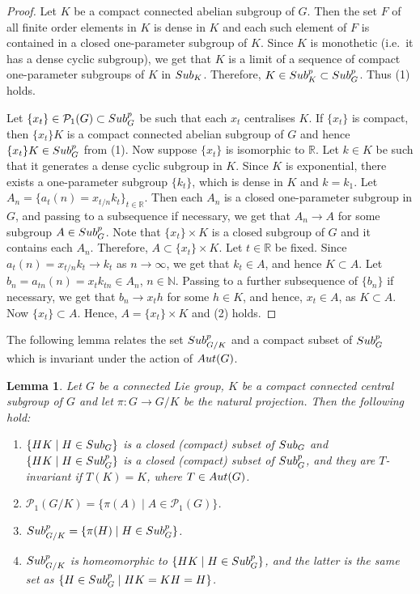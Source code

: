 \documentclass{amsart}
\numberwithin{equation}{section}
\newcommand{\Aut}{{\rm Aut}}
\newcommand{\Sub}{{\rm Sub}}
\newcommand{\N}{{\mathbb N}}
\newcommand{\R}{{\mathbb R}}
\newcommand{\spg}{{\rm Sub}^p_G}
\newcommand{\spp}{{\rm Sub}^{p}}
\newtheorem{lem}[thm]{Lemma}
\theoremstyle{remark}
\newcommand{\cP}{{\mathcal{P}}}
\begin{document}
\begin{proof}
Let $K$ be a compact connected abelian subgroup of $G$. Then the set $F$ of all finite order elements in $K$ is 
dense in $K$ and each such element of $F$ is contained in a closed one-parameter subgroup of $K$. 
Since $K$ is monothetic (i.e.\ it has a dense cyclic subgroup), we get that $K$ is a limit of a sequence of 
compact one-parameter subgroups of $K$ in $\Sub_K$. Therefore, $K\in\spp_K\subset\spg$. Thus (1) holds. 

Let $\{x_t\}\in\cP_1(G)\subset \spg$ be such that each $x_t$ centralises $K$. If $\{x_t\}$ is compact, then 
$\{x_t\}K$ is a compact connected abelian subgroup of $G$ and hence $\{x_t\}K\in\spg$ from (1). 
Now suppose $\{x_t\}$ is isomorphic to $\R$. Let $k\in K$ be such that it generates a 
dense cyclic subgroup in $K$. Since $K$ is exponential, there exists a one-parameter subgroup 
$\{k_t\}$, which is dense in $K$ and $k=k_1$. Let 
$A_n=\{a_t(n)=x_{t/n}k_t\}_{t\in\R}$. Then each $A_n$ is a closed one-parameter subgroup 
in $G$, and passing to a subsequence if necessary, we get that $A_n\to A$ for some subgroup $A\in\spg$. 
Note that $\{x_t\}\times K$ is a closed subgroup of $G$ and it contains each $A_n$. Therefore,  
$A\subset \{x_t\}\times K$. Let $t\in\R$ be fixed. Since $a_t(n)=x_{t/n}k_t\to k_t$ as $n\to\infty$, we get 
that $k_t\in A$, and hence $K\subset A$. Let $b_n=a_{tn}(n)=x_tk_{tn}\in A_n$, $n\in\N$. 
Passing to a further subsequence of $\{b_n\}$ if necessary, 
we get that $b_n\to x_th$ for some $h\in K$, and hence, $x_t\in A$, as $K\subset A$. 
Now $\{x_t\}\subset A$. Hence, $A=\{x_t\}\times K$ and (2) holds. 
\end{proof}

The following lemma relates the set $\spp_{G/K}$ and a compact subset of $\spg$ which is invariant 
under the action of $\Aut(G)$.

\begin{lem} \label{subpgk} Let $G$ be a connected Lie group, $K$ be a compact connected central subgroup of 
$G$ and let $\pi:G\to G/K$ be the natural projection. Then the following hold:
\begin{enumerate}
\item $\{HK\mid H\in\Sub_G\}$ is a closed \rm{(}compact\rm{)} subset of $\Sub_G$ and $\{HK\mid H\in\spg\}$ is a closed 
\rm{(}compact\rm{)} subset of $\spg$, and they are $T$-invariant if $T(K)=K$, where $T\in\Aut(G)$. 
\item $\cP_1(G/K)=\{\pi(A)\mid A\in\cP_1(G)\}$. 
\item $\Sub^p_{G/K}=\{\pi(H)\mid H\in\spg\}$.
\item $\Sub^p_{G/K}$ is homeomorphic to $\{HK\mid H\in\spg\}$, and the latter is the same set as $\{H\in\spg\mid HK=KH=H\}$. 
\end{enumerate}
\end{lem}
\end{document}
